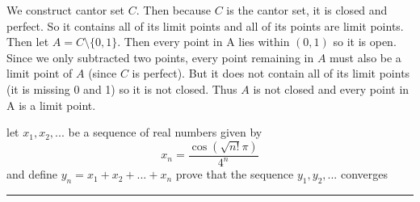 \documentclass[11pt]{article}
\begin{document}
We construct cantor set $C$. Then because $C$ is the cantor set, it is closed and perfect. So it contains all of its limit points and all of its points are limit points.  Then let $A = C \setminus \{0, 1\}$. Then every point in A lies within $(0, 1)$ so it is open. Since we only subtracted two points, every point remaining in $A$ must also be a limit point of $A$ (since $C$ is perfect). But it does not contain all of its limit points (it is missing 0 and 1) so it is not closed. Thus $A$ is not closed and every point in A is a limit point. 



\newpage
{}
let $x_1, x_2, ...$ be a sequence of real numbers given by
$$x_n = \frac{\cos(\sqrt{n!}\pi)}{4^n}$$
and define
$y_n = x_1 + x_2 + ... + x_n$
prove that the sequence $y_1, y_2, ...$ converges
\hrule
\end{document}
